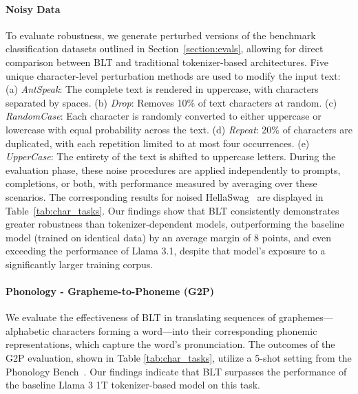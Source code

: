 \paragraph{Noisy Data} To evaluate robustness, we generate perturbed versions of the benchmark classification datasets outlined in Section~\ref{section:evals}, allowing for direct comparison between {\textsc BLT} and traditional tokenizer-based architectures. Five unique character-level perturbation methods are used to modify the input text: (a) \textit{AntSpeak}: The complete text is rendered in uppercase, with characters separated by spaces. (b) \textit{Drop}: Removes 10\% of text characters at random. (c) \textit{RandomCase}: Each character is randomly converted to either uppercase or lowercase with equal probability across the text. (d) \textit{Repeat}: 20\% of characters are duplicated, with each repetition limited to at most four occurrences. (e) \textit{UpperCase}: The entirety of the text is shifted to uppercase letters. During the evaluation phase, these noise procedures are applied independently to prompts, completions, or both, with performance measured by averaging over these scenarios. The corresponding results for noised HellaSwag~\citep{Eval_hellaswag} are displayed in Table~\ref{tab:char_tasks}. Our findings show that {\textsc BLT} consistently demonstrates greater robustness than tokenizer-dependent models, outperforming the baseline model (trained on identical data) by an average margin of 8 points, and even exceeding the performance of Llama 3.1, despite that model's exposure to a significantly larger training corpus.

\paragraph{Phonology - Grapheme-to-Phoneme (G2P)} We evaluate the effectiveness of {\textsc BLT} in translating sequences of graphemes—alphabetic characters forming a word—into their corresponding phonemic representations, which capture the word's pronunciation. The outcomes of the G2P evaluation, shown in Table \ref{tab:char_tasks}, utilize a 5-shot setting from the Phonology Bench~\citep{suvarna2024phonologybench}. Our findings indicate that {\textsc BLT} surpasses the performance of the baseline Llama 3 1T tokenizer-based model on this task.

